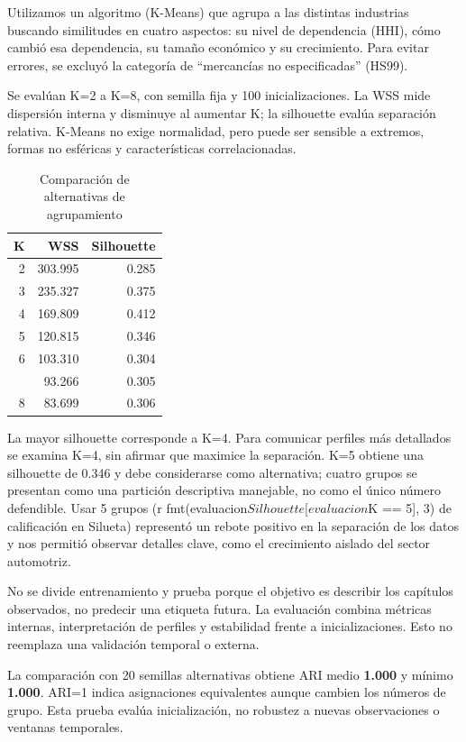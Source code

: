\documentclass[
  spanish,
  10pt,
]{article}
\begin{document}
Utilizamos un algoritmo (K-Means) que agrupa a las distintas industrias
buscando similitudes en cuatro aspectos: su nivel de dependencia (HHI),
cómo cambió esa dependencia, su tamaño económico y su crecimiento. Para
evitar errores, se excluyó la categoría de ``mercancías no
especificadas'' (HS99).

Se evalúan K=2 a K=8, con semilla fija y 100 inicializaciones. La WSS
mide dispersión interna y disminuye al aumentar K; la silhouette evalúa
separación relativa. K-Means no exige normalidad, pero puede ser
sensible a extremos, formas no esféricas y características
correlacionadas.

\begin{table}

\caption{\label{tab:evaluacion-k}Comparación de alternativas de agrupamiento}
\centering
\begin{tabular}[t]{rrr}
\toprule
K & WSS & Silhouette\\
\midrule
2 & 303.995 & 0.285\\
3 & 235.327 & 0.375\\
4 & 169.809 & 0.412\\
5 & 120.815 & 0.346\\
6 & 103.310 & 0.304\\
\addlinespace
7 & 93.266 & 0.305\\
8 & 83.699 & 0.306\\
\bottomrule
\end{tabular}
\end{table}

La mayor silhouette corresponde a K=4. Para comunicar perfiles más
detallados se examina K=4, sin afirmar que maximice la separación. K=5
obtiene una silhouette de 0.346 y debe considerarse como alternativa;
cuatro grupos se presentan como una partición descriptiva manejable, no
como el único número defendible. Usar 5 grupos (r
fmt(evaluacion\(Silhouette[evaluacion\)K == 5{]}, 3) de calificación en
Silueta) representó un rebote positivo en la separación de los datos y
nos permitió observar detalles clave, como el crecimiento aislado del
sector automotriz.

No se divide entrenamiento y prueba porque el objetivo es describir los
capítulos observados, no predecir una etiqueta futura. La evaluación
combina métricas internas, interpretación de perfiles y estabilidad
frente a inicializaciones. Esto no reemplaza una validación temporal o
externa.

La comparación con 20 semillas alternativas obtiene ARI medio
\textbf{1.000} y mínimo \textbf{1.000}. ARI=1 indica asignaciones
equivalentes aunque cambien los números de grupo. Esta prueba evalúa
inicialización, no robustez a nuevas observaciones o ventanas
temporales.
\end{document}

